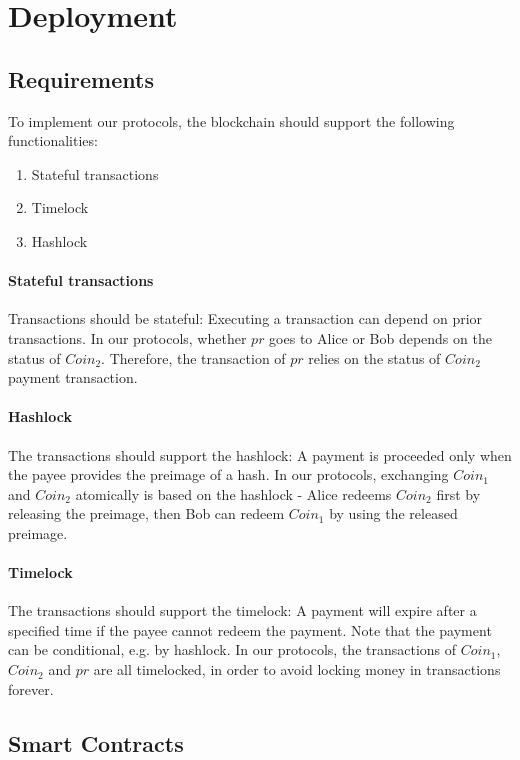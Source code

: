 \section{Deployment}
\label{sec:deployment}

\subsection{Requirements}

To implement our protocols, the blockchain should support the following functionalities:

\begin{enumerate}
    \item Stateful transactions
    \item Timelock
    \item Hashlock
\end{enumerate}

\paragraph{Stateful transactions}
Transactions should be stateful: Executing a transaction can depend on prior transactions.
In our protocols, whether $pr$ goes to Alice or Bob depends on the status of $Coin_2$.
Therefore, the transaction of $pr$ relies on the status of $Coin_2$ payment transaction.

\paragraph{Hashlock}
The transactions should support the hashlock: A payment is proceeded only when the payee provides the preimage of a hash.
In our protocols, exchanging $Coin_1$ and $Coin_2$ atomically is based on the hashlock -
Alice redeems $Coin_2$ first by releasing the preimage, then Bob can redeem $Coin_1$ by using the released preimage.

\paragraph{Timelock}
The transactions should support the timelock: A payment will expire after a specified time if the payee cannot redeem the payment.
Note that the payment can be conditional, e.g. by hashlock.
In our protocols, the transactions of $Coin_1$, $Coin_2$ and $pr$ are all timelocked, in order to avoid locking money in transactions forever.

\subsection{Smart Contracts}

